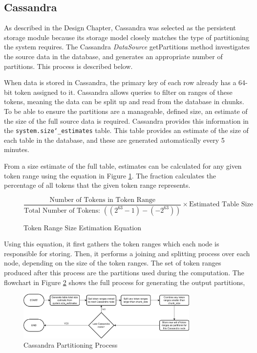 \subsection{Cassandra}
As described in the Design Chapter, Cassandra was selected as the persistent storage module because its storage model closely matches the type of partitioning the system requires. The Cassandra \textit{DataSource} getPartitions method investigates the source data in the database, and generates an appropriate number of partitions. This process is described below.

When data is stored in Cassandra, the primary key of each row already has a 64-bit token assigned to it. Cassandra allows queries to filter on ranges of these tokens, meaning the data can be split up and read from the database in chunks. To be able to ensure the partitions are a manageable, defined size, an estimate of the size of the full source data is required. Cassandra provides this information in the \texttt{system.size\char`_estimates} table. This table provides an estimate of the size of each table in the database, and these are generated automatically every 5 minutes.

From a size estimate of the full table, estimates can be calculated for any given token range using the equation in Figure \ref{fig:token-range-estimation}. The fraction calculates the percentage of all tokens that the given token range represents.

\begin{figure}[h]
	\centering
	\[ \frac{\text{Number of Tokens in Token Range}}{\text{Total Number of Tokens: } ((2^{63}-1) - (-2^{63}))} \times \text{Estimated Table Size} \]
	\caption{Token Range Size Estimation Equation}
	\label{fig:token-range-estimation}
\end{figure}

Using this equation, it first gathers the token ranges which each node is responsible for storing. Then, it performs a joining and splitting process over each node, depending on the size of the token ranges. The set of token ranges produced after this process are the partitions used during the computation. The flowchart in Figure \ref{fig:cassandra-partitioning-decision-tree} shows the full process for generating the output partitions, 

\begin{figure}[h]
	\centering
	\includegraphics[width=0.8\textwidth]{chapters/diagrams/implementation/cassandra-partitioning-decision-tree}
	\caption{Cassandra Partitioning Process}
	\label{fig:cassandra-partitioning-decision-tree}
\end{figure}


